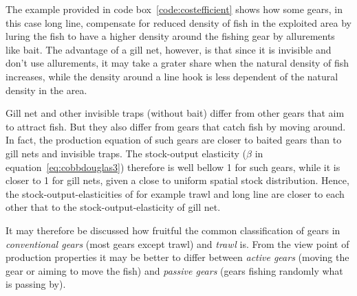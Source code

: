 \documentclass[11pt,fleqn]{book} %
\begin{document}
The example provided in code box~\ref{code:costefficient} shows how some gears, in this case long line, compensate for reduced density of fish in the exploited area by luring the fish to have a higher density around the fishing gear by allurements like bait. The advantage of a gill net, however, is that since it is invisible and don't use allurements, it may take a grater share when the natural density of fish increases, while the density around a line hook is less dependent of the natural density in the area.

\begin{corollary}
\hfill \break
Gill net and other invisible traps (without bait) differ from other gears that aim to attract fish. But they also differ from gears that catch fish by moving around. In fact, the production equation of such gears are closer to baited gears than to gill nets and invisible traps. The stock-output elasticity ($\beta$ in equation~\ref{eq:cobbdouglas3}) therefore is well bellow 1 for such gears, while it is closer to 1 for gill nets, given a close to uniform spatial stock distribution. Hence, the stock-output-elasticities of for example trawl and long line are closer to each other that to the stock-output-elasticity of gill net. 

It may therefore be discussed how fruitful the common classification of gears in \textit{conventional gears} (most gears except trawl) and \textit{trawl} is. From the view point of production properties it may be better to differ between \textit{active gears} (moving the gear or aiming to move the fish) and \textit{passive gears} (gears fishing randomly what is passing by).
\end{corollary}

\begin{figure}[!htb]
\end{figure}
\end{document}
